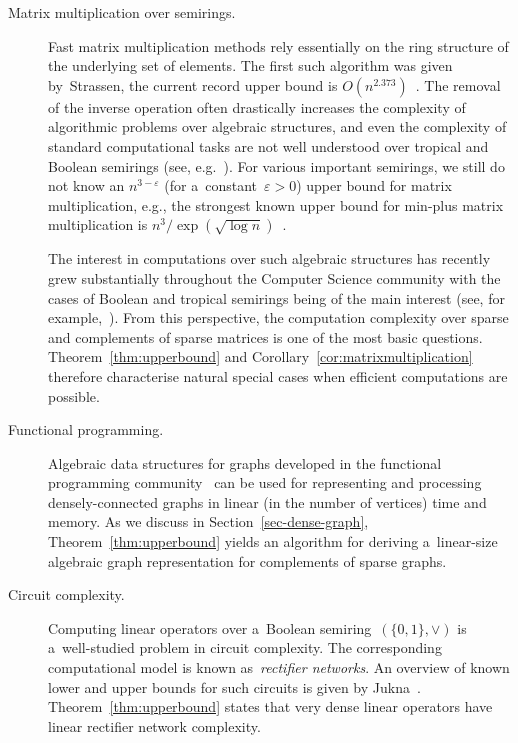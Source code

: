 \documentclass[a4paper,UKenglish,cleveref, autoref]{lipics-v2019}
\begin{document}
\begin{description}
\item[Matrix multiplication over semirings.] Fast matrix
multiplication methods rely essentially on the ring structure of the underlying
set of elements. The first such algorithm was given by~Strassen,
the current record upper bound is $O(n^{2.373})$~\cite{DBLP:conf/stoc/Williams12, DBLP:conf/issac/Gall14a}.
The removal of the inverse operation often drastically increases the complexity
of algorithmic problems over algebraic structures, and even the complexity of
standard computational tasks are not well understood over tropical and
Boolean semirings (see, e.g.~\cite{Williams14,GrigorievP15}).
For various important semirings,
we still do not know an $n^{3-\varepsilon}$ (for a~constant~$\varepsilon>0$) upper
bound for matrix multiplication, e.g., the strongest known upper bound for
min-plus matrix multiplication is $n^3/\exp(\sqrt{\log n})$~\cite{Williams14}.

The interest in computations over such algebraic structures has
recently grew substantially throughout the
Computer Science community with the cases of Boolean and
tropical semirings being of the main interest (see, for
example,~\cite{Jukna16,Williams14,butkovic10systems}).
From this perspective, the computation complexity over sparse and complements of
sparse matrices is one of the most basic questions.
Theorem~\ref{thm:upperbound} and Corollary~\ref{cor:matrixmultiplication}
therefore characterise natural special
cases when efficient computations are possible.

\item[Functional programming.]
Algebraic data structures for graphs developed in the functional programming
community~\cite{mokhov2017algebraic} can be used for representing and processing
densely-connected graphs in linear (in the number of vertices) time and memory.
As we discuss in Section~\ref{sec-dense-graph}, Theorem~\ref{thm:upperbound}
yields an algorithm for deriving a~linear-size algebraic graph representation
for complements of sparse graphs.

\item[Circuit complexity.] Computing linear operators over
a~Boolean semiring~$(\{0,1\}, \lor)$ is a~well-studied problem
in circuit complexity. The corresponding computational model is known
as~\emph{rectifier networks}. An overview of known lower and upper bounds for
such circuits is given by Jukna~\cite[Section~13.6]{DBLP:books/daglib/0028687}.
Theorem~\ref{thm:upperbound} states that very dense linear operators have
linear rectifier network complexity.
\end{description}
\end{document}
